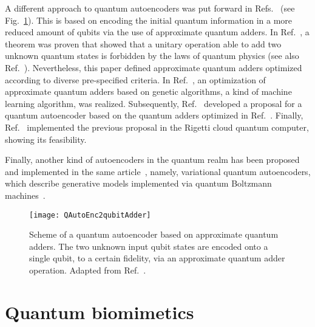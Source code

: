 \documentclass[12pt]{iopart}
\begin{document}
A different approach to quantum autoencoders was put forward in Refs.~\cite{LamataAutoencoder,DingAutoencoder} (see Fig.~\ref{Qauto2}). This is based on encoding the initial quantum information in a more reduced amount of qubits via the use of approximate quantum adders. In Ref.~\cite{UnaiAdder}, a theorem was proven that showed that a unitary operation able to add two unknown quantum states is forbidden by the laws of quantum physics (see also Ref.~\cite{Oszmaniec}). Nevertheless, this paper defined approximate quantum adders optimized according to diverse pre-specified criteria. In Ref.~\cite{RuiGenetic}, an optimization of approximate quantum adders based on genetic algorithms, a kind of machine learning algorithm, was realized. Subsequently, Ref.~\cite{LamataAutoencoder} developed a proposal for a quantum autoencoder based on the quantum adders optimized in Ref.~\cite{RuiGenetic}. Finally, Ref.~\cite{DingAutoencoder} implemented the previous proposal in the Rigetti cloud quantum computer, showing its feasibility. 



Finally, another kind of autoencoders in the quantum realm has been proposed and implemented in the same article~\cite{AminAutoencoder}, namely, variational quantum autoencoders, which describe generative models implemented via quantum Boltzmann machines~\cite{AminMelkoQBM}.

\begin{figure}[h!]
\begin{center}
\texttt{[image: QAutoEnc2qubitAdder]}
\caption{Scheme of a quantum autoencoder based on approximate quantum adders. The two unknown input qubit states are encoded onto a single qubit, to a certain fidelity, via an approximate quantum adder operation. Adapted from Ref.~\cite{LamataAutoencoder}.}
\label{Qauto2}
\end{center}
\end{figure} 


\section{Quantum biomimetics\label{QAL}}
\end{document}
